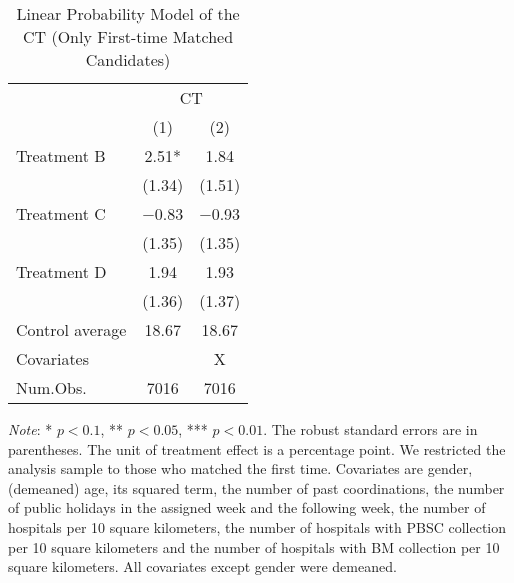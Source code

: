 \documentclass[12pt, a4paper]{article}
\begin{document}
\begin{table}[H]

\caption{\label{tab:lm-test-initial}Linear Probability Model of the CT (Only First-time Matched Candidates)}
\centering
\fontsize{8}{10}\selectfont
\begin{threeparttable}
\begin{tabular}[t]{lcc}
\toprule
\multicolumn{1}{c}{ } & \multicolumn{2}{c}{CT} \\
\cmidrule(l{3pt}r{3pt}){2-3}
  & (1) & (2)\\
\midrule
Treatment B & \num{2.51}* & \num{1.84}\\
 & (\num{1.34}) & (\num{1.51})\\
Treatment C & \num{-0.83} & \num{-0.93}\\
 & (\num{1.35}) & (\num{1.35})\\
Treatment D & \num{1.94} & \num{1.93}\\
 & (\num{1.36}) & (\num{1.37})\\
\midrule
Control average & 18.67 & 18.67\\
Covariates &  & X\\
Num.Obs. & \num{7016} & \num{7016}\\
\bottomrule
\end{tabular}
\begin{tablenotes}
\item \emph{Note}: * $p < 0.1$, ** $p < 0.05$, *** $p < 0.01$. The robust standard errors are in parentheses. The unit of treatment effect is a percentage point. We restricted the analysis sample to those who matched the first time. Covariates are gender, (demeaned) age, its squared term, the number of past coordinations, the number of public holidays in the assigned week and the following week, the number of hospitals per 10 square kilometers, the number of hospitals with PBSC collection per 10 square kilometers and the number of hospitals with BM collection per 10 square kilometers. All covariates except gender were demeaned.
\end{tablenotes}
\end{threeparttable}
\end{table}
\end{document}
